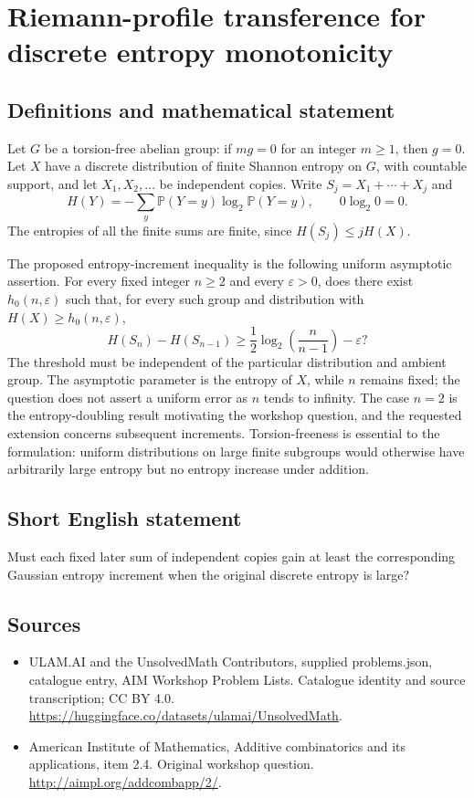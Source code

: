 \documentclass[11pt,a4paper]{article}
\begin{document}
\section*{Riemann-profile transference for discrete entropy monotonicity}\label{statement}

\subsection{Definitions and mathematical statement}
Let $G$ be a torsion-free abelian group: if $mg=0$ for an integer $m\geq1$, then $g=0$.
Let $X$ have a discrete distribution of finite Shannon entropy on $G$, with countable support, and let $X_1,X_2,\ldots$ be independent copies.
Write $S_j=X_1+\cdots+X_j$ and
\[
 H(Y)=-\sum_y\mathbb P(Y=y)\log_2\mathbb P(Y=y),
 \qquad 0\log_2 0=0.
\]
The entropies of all the finite sums are finite, since $H(S_j)\leq jH(X)$.

The proposed entropy-increment inequality is the following uniform asymptotic assertion.
For every fixed integer $n\geq2$ and every $\varepsilon>0$, does there exist $h_0(n,\varepsilon)$ such that, for every such group and distribution with $H(X)\geq h_0(n,\varepsilon)$,
\[
 H(S_n)-H(S_{n-1})
 \geq\frac12\log_2\!\left(\frac n{n-1}\right)-\varepsilon?
\]
The threshold must be independent of the particular distribution and ambient group.
The asymptotic parameter is the entropy of $X$, while $n$ remains fixed; the question does not assert a uniform error as $n$ tends to infinity.
The case $n=2$ is the entropy-doubling result motivating the workshop question, and the requested extension concerns subsequent increments.
Torsion-freeness is essential to the formulation: uniform distributions on large finite subgroups would otherwise have arbitrarily large entropy but no entropy increase under addition.
\subsection{Short English statement}
Must each fixed later sum of independent copies gain at least the corresponding Gaussian entropy increment when the original discrete entropy is large?
\subsection{Sources}
\begin{itemize}
\item[S1] ULAM.AI and the UnsolvedMath Contributors, supplied problems.json, catalogue entry, AIM Workshop Problem Lists. Catalogue identity and source transcription; CC BY 4.0.
\url{https://huggingface.co/datasets/ulamai/UnsolvedMath}.
\item[S2] American Institute of Mathematics, Additive combinatorics and its applications, item 2.4. Original workshop question.
\url{http://aimpl.org/addcombapp/2/}.
\end{itemize}
\end{document}
